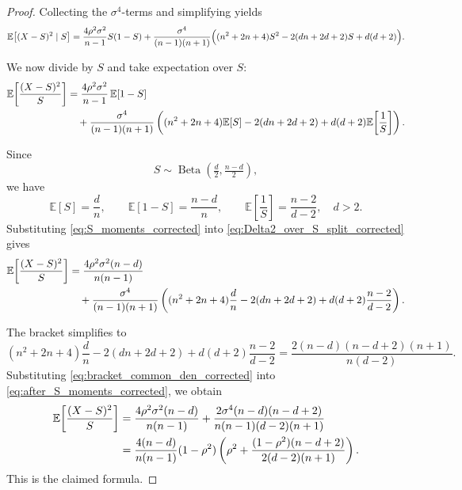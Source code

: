 \documentclass[10pt,a4paper]{amsart}
\DeclareMathOperator{\BetaDist}{Beta}
\begin{document}
\begin{proof}
Collecting the $\sigma^4$-terms and simplifying yields
\begin{equation}
\mathbb E\big[(X-S)^2\mid S\big]
=
\frac{4\rho^2\sigma^2}{n-1}S(1-S)
+
\frac{\sigma^4}{(n-1)(n+1)}
\Bigl((n^2+2n+4)S^2-2(dn+2d+2)S+d(d+2)\Bigr).
\label{eq:cond_second_moment_compact_corrected}
\end{equation}

We now divide by $S$ and take expectation over $S$:
\begin{align}
\mathbb E\!\left[\frac{(X-S)^2}{S}\right]
&=
\frac{4\rho^2\sigma^2}{n-1}\,\mathbb E[1-S]
\notag\\
&\quad
+
\frac{\sigma^4}{(n-1)(n+1)}
\left(
(n^2+2n+4)\mathbb E[S]
-2(dn+2d+2)
+d(d+2)\mathbb E\!\left[\frac1S\right]
\right).
\label{eq:Delta2_over_S_split_corrected}
\end{align}

Since
\[
S\sim \BetaDist\!\left(\tfrac d2,\tfrac{n-d}{2}\right),
\]
we have
\begin{equation}
\mathbb E[S]=\frac{d}{n},
\qquad
\mathbb E[1-S]=\frac{n-d}{n},
\qquad
\mathbb E\!\left[\frac1S\right]=\frac{n-2}{d-2},
\quad d>2.
\label{eq:S_moments_corrected}
\end{equation}
Substituting \eqref{eq:S_moments_corrected} into \eqref{eq:Delta2_over_S_split_corrected} gives
\begin{align}
\mathbb E\!\left[\frac{(X-S)^2}{S}\right]
&=
\frac{4\rho^2\sigma^2(n-d)}{n(n-1)}
\notag\\
&\quad
+
\frac{\sigma^4}{(n-1)(n+1)}
\left(
(n^2+2n+4)\frac dn
-2(dn+2d+2)
+d(d+2)\frac{n-2}{d-2}
\right).
\label{eq:after_S_moments_corrected}
\end{align}

The bracket simplifies to
\begin{equation}
(n^2+2n+4)\frac dn
-2(dn+2d+2)
+d(d+2)\frac{n-2}{d-2}
=
\frac{2(n-d)(n-d+2)(n+1)}{n(d-2)}.
\label{eq:bracket_common_den_corrected}
\end{equation}
Substituting \eqref{eq:bracket_common_den_corrected} into \eqref{eq:after_S_moments_corrected}, we obtain
\begin{align}
\mathbb E\!\left[\frac{(X-S)^2}{S}\right]
&=
\frac{4\rho^2\sigma^2(n-d)}{n(n-1)}
+
\frac{2\sigma^4(n-d)(n-d+2)}{n(n-1)(d-2)(n+1)}
\notag\\
&=
\frac{4(n-d)}{n(n-1)}(1-\rho^2)
\left(
\rho^2+\frac{(1-\rho^2)(n-d+2)}{2(d-2)(n+1)}
\right).
\label{eq:almost_done_corrected}
\end{align}
This is the claimed formula.
\end{proof}
\end{document}
